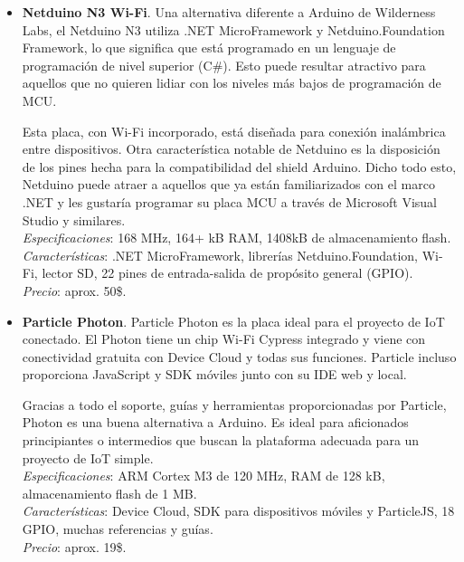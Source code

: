 \documentclass[12pt]{article}
\begin{document}
\begin{itemize}
		\item \textbf{Netduino N3 Wi-Fi}. Una alternativa diferente a Arduino de Wilderness Labs, el Netduino N3 utiliza .NET MicroFramework y Netduino.Foundation Framework, lo que significa que está programado en un lenguaje de programación de nivel superior (C\#). Esto puede resultar atractivo para aquellos que no quieren lidiar con los niveles más bajos de programación de MCU.
		
		Esta placa, con Wi-Fi incorporado, está diseñada para conexión inalámbrica entre dispositivos. Otra característica notable de Netduino es la disposición de los pines hecha para la compatibilidad del shield Arduino. Dicho todo esto, Netduino puede atraer a aquellos que ya están familiarizados con el marco .NET y les gustaría programar su placa MCU a través de Microsoft Visual Studio y similares. \\
		
		\textit{Especificaciones}: 168 MHz, 164+ kB RAM, 1408kB de almacenamiento flash.  \\
		
		\textit{Características}: .NET  MicroFramework, librerías Netduino.Foundation, Wi-Fi, lector SD,  22 pines de entrada-salida de propósito general (GPIO). \\
		
		\textit{Precio}: aprox. 50\$. \\
		
		\item \textbf{Particle Photon}. Particle Photon es la placa ideal para el proyecto de IoT conectado. El Photon tiene un chip Wi-Fi Cypress integrado y viene con conectividad gratuita con Device Cloud y todas sus funciones. Particle incluso proporciona JavaScript y SDK móviles junto con su IDE web y local.
		
		Gracias a todo el soporte, guías y herramientas proporcionadas por Particle, Photon es una buena alternativa a Arduino. Es ideal para aficionados principiantes o intermedios que buscan la plataforma adecuada para un proyecto de IoT simple. \\
		
		\textit{Especificaciones}:  ARM Cortex M3 de 120 MHz, RAM de 128 kB, almacenamiento flash de 1 MB.\\
		
		\textit{Características}: Device Cloud, SDK para dispositivos móviles y ParticleJS, 18 GPIO, muchas referencias y guías. \\
		
		\textit{Precio}: aprox. 19\$.\\
		

\end{itemize}
\end{document}
